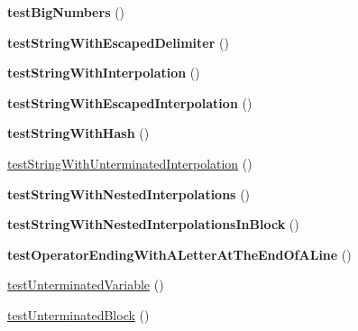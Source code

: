\begin{DoxyCompactItemize}
\item 
{\bfseries test\+Big\+Numbers} ()\hypertarget{class_twig___tests___lexer_test_a6d6824cad71089108e61b9502b11d04e}{}\label{class_twig___tests___lexer_test_a6d6824cad71089108e61b9502b11d04e}

\item 
{\bfseries test\+String\+With\+Escaped\+Delimiter} ()\hypertarget{class_twig___tests___lexer_test_a79d3d1d1e15e26ca95c511a0f4846633}{}\label{class_twig___tests___lexer_test_a79d3d1d1e15e26ca95c511a0f4846633}

\item 
{\bfseries test\+String\+With\+Interpolation} ()\hypertarget{class_twig___tests___lexer_test_a89b81c2b58df50b7a3a433442b4760a6}{}\label{class_twig___tests___lexer_test_a89b81c2b58df50b7a3a433442b4760a6}

\item 
{\bfseries test\+String\+With\+Escaped\+Interpolation} ()\hypertarget{class_twig___tests___lexer_test_a302a741759b6e267cf15827a03b60dab}{}\label{class_twig___tests___lexer_test_a302a741759b6e267cf15827a03b60dab}

\item 
{\bfseries test\+String\+With\+Hash} ()\hypertarget{class_twig___tests___lexer_test_a23d8a497365d1b419adb61b1a21ba173}{}\label{class_twig___tests___lexer_test_a23d8a497365d1b419adb61b1a21ba173}

\item 
\hyperlink{class_twig___tests___lexer_test_ab539b7096460dfe1ad8382569bec23bc}{test\+String\+With\+Unterminated\+Interpolation} ()
\item 
{\bfseries test\+String\+With\+Nested\+Interpolations} ()\hypertarget{class_twig___tests___lexer_test_a373a90f907dc7bc32382573b103a3e77}{}\label{class_twig___tests___lexer_test_a373a90f907dc7bc32382573b103a3e77}

\item 
{\bfseries test\+String\+With\+Nested\+Interpolations\+In\+Block} ()\hypertarget{class_twig___tests___lexer_test_ad656d3411d64fca74f458ccebb766468}{}\label{class_twig___tests___lexer_test_ad656d3411d64fca74f458ccebb766468}

\item 
{\bfseries test\+Operator\+Ending\+With\+A\+Letter\+At\+The\+End\+Of\+A\+Line} ()\hypertarget{class_twig___tests___lexer_test_a5b60dd906b6b0f08a4c1c5931546ebbf}{}\label{class_twig___tests___lexer_test_a5b60dd906b6b0f08a4c1c5931546ebbf}

\item 
\hyperlink{class_twig___tests___lexer_test_a6f36a8af4173293fb9c34a05a8698b7a}{test\+Unterminated\+Variable} ()
\item 
\hyperlink{class_twig___tests___lexer_test_ae05ff323aa0a0525c4f981833ea53884}{test\+Unterminated\+Block} ()
\end{DoxyCompactItemize}
